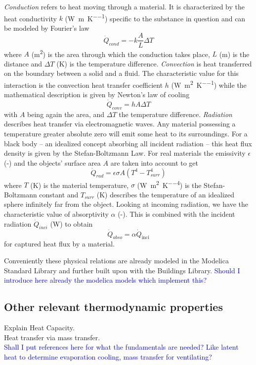 \textit{Conduction} refers to heat moving through a material.
It is characterized by the heat conductivity $k$ (\si{\W\per\m\per\K}) specific to the substance in question and can be modeled by Fourier's law
$$
\dot{Q}_{cond} = -k \frac{A}{L} \Delta T
$$
where $A$ (\si{\square\m}) is the area through which the conduction takes place, $L$ (\si{\m}) is the distance and $\Delta T$ (\si{\K}) is the temperature difference.
\textit{Convection} is heat transferred on the boundary between a solid and a fluid.
The characteristic value for this interaction is the convection heat transfer coefficient $h$ (\si{\W\per\square\m\per\K}) while the mathematical description is given by Newton's law of cooling
$$
\dot{Q}_{conv} = h A \Delta T
$$
with $A$ being again the area, and $\Delta T$ the temperature difference.
\textit{Radiation} describes heat transfer via electromagnetic waves.
Any material possessing a temperature greater absolute zero will emit some heat to its surroundings.
For a black body -- an idealized concept absorbing all incident radiation -- this heat flux density is given by the Stefan-Boltzmann Law.
For real materials the emissivity $\epsilon$ (-) and the objects' surface area $A$ are taken into account to get
$$
\dot{Q}_{rad} = \epsilon \sigma A (T^4 - T_{surr}^4)
$$
where $T$ (\si{\K}) is the material temperature, $\sigma$ (\si{\W\per\square\m\per\K\tothe{4}}) is the Stefan-Boltzmann constant and $T_{surr}$ (\si{\K}) describes the temperature of an idealized sphere infinitely far from the object.
Looking at incoming radiation, we have the characteristic value of absorptivity $\alpha$ (-).
This is combined with the incident radiation $\dot{Q}_{inci}$ (\si{\W}) to obtain 
$$
\dot{Q}_{abso} = \alpha \dot{Q}_{\text{inci}} 
$$
for captured heat flux by a material.

Conveniently these physical relations are already modeled in the Modelica Standard Library and further built upon with the Buildings Library.
\textcolor{Blue}{Should I introduce here already the modelica models which implement this?}



\subsection{Other relevant thermodynamic properties}
\label{sub:ther-props}
Explain Heat Capacity.\\
Heat transfer via mass transfer.\\
\textcolor{Blue}{Shall I put references here for what the fundamentals are needed? Like latent heat to determine evaporation cooling, mass transfer for ventilating?}



